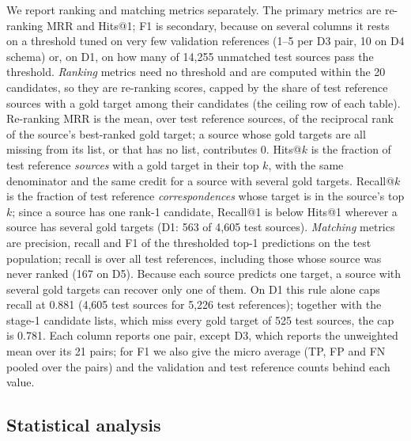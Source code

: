 We report ranking and matching metrics separately. The primary metrics are
re-ranking MRR and Hits@1; F1 is secondary, because on several columns it
rests on a threshold tuned on very few validation references (1--5 per D3
pair, 10 on D4 schema) or, on D1, on how many of 14,255 unmatched test sources
pass the threshold. \emph{Ranking} metrics need no threshold and are computed within
the 20 candidates, so they are re-ranking scores, capped by the share of test
reference sources with a gold target among their candidates (the ceiling row
of each table). Re-ranking MRR is the mean, over test reference sources, of the
reciprocal rank of the source's best-ranked gold target; a source whose gold
targets are all missing from its list, or that has no list, contributes 0.
Hits@$k$ is the fraction of test reference \emph{sources} with a gold target
in their top $k$, with the same denominator and the same credit for a source
with several gold targets. Recall@$k$ is the fraction of test reference
\emph{correspondences} whose target is in the source's top $k$; since a
source has one rank-1 candidate, Recall@1 is below Hits@1 wherever a source has
several gold targets (D1: 563 of 4,605 test sources).
\emph{Matching} metrics are precision, recall and F1 of the thresholded
top-1 predictions on the test population; recall is over all test
references, including those whose source was never ranked (167 on D5).
Because each source predicts one target, a source with several gold targets
can recover only one of them. On D1 this rule alone caps recall at 0.881
(4,605 test sources for 5,226 test references); together with the stage-1
candidate lists, which miss every gold target of 525 test sources, the cap
is 0.781. Each column reports one pair, except D3, which reports
the unweighted mean over its 21 pairs; for F1 we also give the micro average
(TP, FP and FN pooled over the pairs) and the validation and test reference
counts behind each value.

\subsection{Statistical analysis}
\label{sec:statistics}


